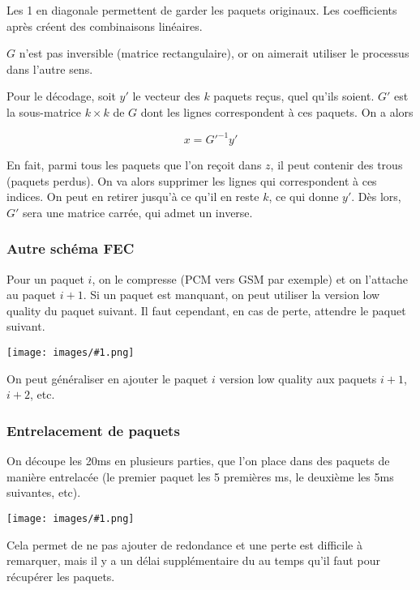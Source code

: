 \documentclass[10pt,a4paper]{report}
\newcommand{\dessinS}[2]{\begin{center}\texttt{[image: images/\#1.png]}\end{center}}
\begin{document}
			Les 1 en diagonale permettent de garder les paquets originaux. Les coefficients après créent des combinaisons linéaires.
			
			$G$ n'est pas inversible (matrice rectangulaire), or on aimerait utiliser le processus dans l'autre sens.
			
			
			Pour le décodage, soit $y'$ le vecteur des $k$ paquets reçus, quel qu'ils soient. $G'$ est la sous-matrice $k \times k$ de $G$ dont les lignes correspondent à ces paquets. On a alors
			
			$$x = G'^{-1} y'$$
			
			En fait, parmi tous les paquets que l'on reçoit dans $z$, il peut contenir des trous (paquets perdus). On va alors supprimer les lignes qui correspondent à ces indices. On peut en retirer jusqu'à ce qu'il en reste $k$, ce qui donne $y'$. Dès lors, $G'$ sera une matrice carrée, qui admet un inverse.
			
			\subsubsection{Autre schéma FEC}
		
	
			Pour un paquet $i$, on le compresse (PCM vers GSM par exemple) et on l'attache au paquet $i + 1$. Si un paquet est manquant, on peut utiliser la version low quality du paquet suivant. Il faut cependant, en cas de perte, attendre le paquet suivant.
			
			\dessinS{82}{.8}
			
			On peut généraliser en ajouter le paquet $i$ version low quality aux paquets $i + 1$, $i + 2$, etc.
			
			\subsubsection{Entrelacement de paquets}
			
			On découpe les 20ms en plusieurs parties, que l'on place dans des paquets de manière entrelacée (le premier paquet les 5 premières ms, le deuxième les 5ms suivantes, etc).
			
			\dessinS{83}{.8}
			
			Cela permet de ne pas ajouter de redondance et une perte est difficile à remarquer, mais il y a un délai supplémentaire du au temps qu'il faut pour récupérer les paquets.
			
			
			
\end{document}
